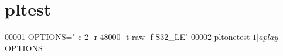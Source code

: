 \hypertarget{pltest_source}{\section{pltest}
\label{pltest_source}
}

\begin{DoxyCode}
00001 OPTIONS="-c 2 -r 48000 -t raw -f S32\_LE"
00002 pltonetest $1 | aplay $OPTIONS
\end{DoxyCode}
